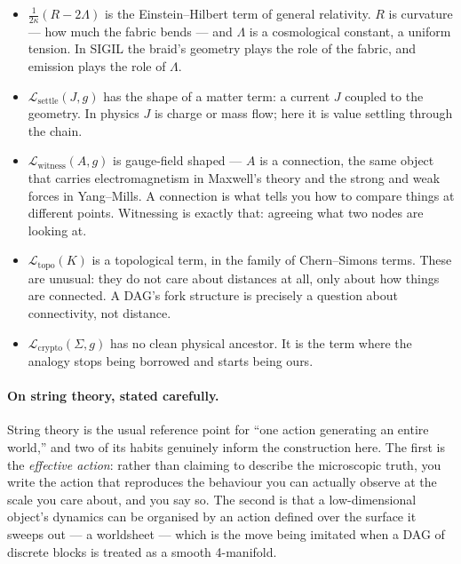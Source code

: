 \documentclass[10pt,a4paper]{article}
\begin{document}
\begin{itemize}\itemsep2pt
  \item $\tfrac{1}{2\kappa}(R - 2\Lambda)$ is the Einstein--Hilbert term of general
        relativity. $R$ is curvature — how much the fabric bends — and $\Lambda$ is a
        cosmological constant, a uniform tension. In SIGIL the braid's geometry plays
        the role of the fabric, and emission plays the role of $\Lambda$.
  \item $\mathcal{L}_{\mathrm{settle}}(J,g)$ has the shape of a matter term: a current
        $J$ coupled to the geometry. In physics $J$ is charge or mass flow; here it is
        value settling through the chain.
  \item $\mathcal{L}_{\mathrm{witness}}(A,g)$ is gauge-field shaped — $A$ is a
        connection, the same object that carries electromagnetism in Maxwell's theory
        and the strong and weak forces in Yang--Mills. A connection is what tells you
        how to compare things at different points. Witnessing is exactly that: agreeing
        what two nodes are looking at.
  \item $\mathcal{L}_{\mathrm{topo}}(K)$ is a topological term, in the family of
        Chern--Simons terms. These are unusual: they do not care about distances at all,
        only about how things are connected. A DAG's fork structure is precisely a
        question about connectivity, not distance.
  \item $\mathcal{L}_{\mathrm{crypto}}(\Sigma,g)$ has no clean physical ancestor. It is
        the term where the analogy stops being borrowed and starts being ours.
\end{itemize}

\paragraph{On string theory, stated carefully.} String theory is the usual reference
point for ``one action generating an entire world,'' and two of its habits genuinely
inform the construction here. The first is the \emph{effective action}: rather than
claiming to describe the microscopic truth, you write the action that reproduces the
behaviour you can actually observe at the scale you care about, and you say so. The
second is that a low-dimensional object's dynamics can be organised by an action defined
over the surface it sweeps out — a worldsheet — which is the move being imitated when a
DAG of discrete blocks is treated as a smooth 4-manifold.
\end{document}
